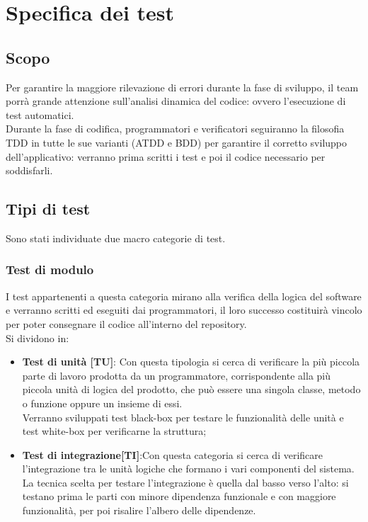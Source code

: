 \documentclass[PianoDiProgetto.tex]{subfiles}
\begin{document}
\chapter{Specifica dei test}

\section{Scopo}
Per garantire la maggiore rilevazione di errori durante la fase di sviluppo, il team porrà grande attenzione sull'analisi dinamica del codice: ovvero l'esecuzione di test automatici. \\
Durante la fase di codifica, programmatori e verificatori seguiranno la filosofia TDD in tutte le sue varianti (ATDD e BDD) per garantire il corretto sviluppo dell'applicativo: verranno prima scritti i test e poi il codice necessario per soddisfarli.

\section{Tipi di test}
Sono stati individuate due macro categorie di test.

\subsection{Test di modulo}
I test appartenenti a questa categoria mirano alla verifica della logica del software e verranno scritti ed eseguiti dai programmatori, il loro successo costituirà vincolo per poter consegnare il codice all'interno del repository. \\
Si dividono in:
\begin{itemize}
	\item \textbf{Test di unità [TU]}: Con questa tipologia si cerca di verificare la più piccola parte di lavoro prodotta da un programmatore, corrispondente alla più piccola unità di logica del prodotto, che può essere una singola classe, metodo o funzione oppure un insieme di essi. \\
	Verranno sviluppati test black-box per testare le funzionalità delle unità e test white-box per verificarne la struttura;
	\item \textbf{Test di integrazione[TI]}:Con questa categoria si cerca di verificare l'integrazione tra le unità logiche che formano i vari componenti del sistema.\\
	La tecnica scelta per testare l'integrazione è quella dal basso verso l'alto: si testano prima le parti con minore dipendenza funzionale e con maggiore funzionalità, per poi risalire l'albero delle dipendenze.\\
\end{itemize}
\end{document}
